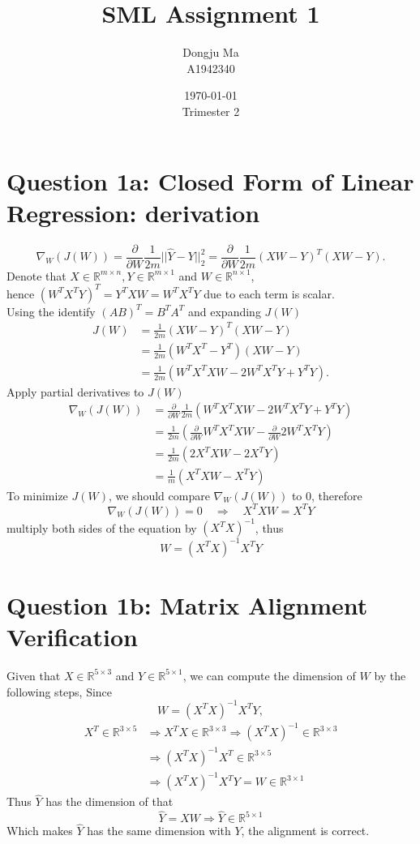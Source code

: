\documentclass{article}
\title{SML Assignment 1}
\author{Dongju Ma \\ A1942340}
\date{\today \\ Trimester 2}
\begin{document}
\maketitle

\section*{Question 1a: Closed Form of Linear Regression: derivation}
$$
\nabla_W(J( {W})) 
=\frac{\partial}{\partial W}\frac{1}{2m}||\hat{ {Y}} -  {Y}||_2^2 
=\frac{\partial}{\partial W}\frac{1}{2m}(XW - Y )^T (XW - Y). 
$$
Denote that $X \in \mathbb{R}^ {m \times n}, Y \in \mathbb{R}^ {m \times 1}$ and $W\in \mathbb{R}^ {n \times 1}$, \\
hence ${(W^TX^TY)}^T = Y^TXW =W^TX^TY$ due to each term is scalar. \\  
Using the identify $(AB)^T = B^T A^T$ and expanding $J(W)$
\begin{align*}
    J(W) &= \frac{1}{2m}(XW - Y )^T (XW - Y) \\
    &= \frac{1}{2m}(W^TX^T - Y^T) (XW - Y) \\
    &= \frac{1}{2m} \left( W^T X^T X W - 2 W^T X^T Y + Y^TY \right).
\end{align*}
Apply partial derivatives to $J(W)$
\begin{align*}
    \nabla_W(J( {W})) &= \frac{\partial}{\partial W} \frac{1}{2m} ( W^T X^T X W - 2 W^T X^T Y + Y^TY ) \\
    &= \frac{1}{2m} \left(\frac{\partial}{\partial W} W^T X^T X W - \frac{\partial}{\partial W} 2 W^T X^T Y \right) \\
    &= \frac{1}{2m}(2 X^T X W - 2 X^T Y) \\
    &= \frac{1}{m} (X^T X W - X^T Y) 
\end{align*}
To minimize $ J( {W}) $,  we should compare $\nabla_W(J( {W}))$ to 0, therefore
$$
\nabla_W(J( {W})) = 0 \quad \Rightarrow \quad X^TX W = X^T Y
$$
multiply both sides of the equation by $(X^TX)^{-1}$, thus
$$
W = (X^TX)^{-1} X^T Y
$$

\clearpage
\section*{Question 1b: Matrix Alignment Verification}
Given that $X \in \mathbb{R}^{5 \times 3}$ and $Y \in \mathbb{R}^{5 \times 1}$,  
we can compute the dimension of $W$ by the following steps, Since
$$
W = (X^TX)^{-1} X^T Y,
$$
\begin{align*}
X^T \in \mathbb{R}^{3 \times 5} &\Rightarrow X^TX \in \mathbb{R}^{3 \times 3}
\Rightarrow (X^TX)^{-1} \in \mathbb{R}^{3 \times 3} \\
&\Rightarrow (X^TX)^{-1} X^T \in \mathbb{R}^{3 \times 5} \\ 
&\Rightarrow (X^TX)^{-1} X^T Y = W \in \mathbb{R}^{3 \times 1}
\end{align*}
Thus $\hat{Y} $ has the dimension of that
$$
\hat{Y} = XW \Rightarrow \hat{Y} \in \mathbb{R}^{5 \times 1}
$$
Which makes $\hat{Y}$ has the same dimension with $Y$, the alignment is correct.
\clearpage
\end{document}
